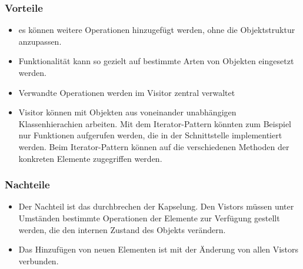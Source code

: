 \subsubsection{Vorteile}
\begin{itemize}
\item es können weitere Operationen hinzugefügt werden, ohne die Objektstruktur anzupassen.
\item Funktionalität kann so gezielt auf bestimmte Arten von Objekten eingesetzt werden.
\item Verwandte Operationen werden im Visitor zentral verwaltet
\item Visitor können mit Objekten aus voneinander unabhängigen Klassenhierachien arbeiten. Mit dem Iterator-Pattern könnten zum Beispiel nur Funktionen aufgerufen werden, die in der Schnittstelle implementiert werden. Beim Iterator-Pattern können auf die verschiedenen Methoden der konkreten Elemente zugegriffen werden.
\end{itemize}
\subsubsection{Nachteile}
\begin{itemize}

\item Der Nachteil ist das durchbrechen der Kapselung. Den Vistors müssen unter Umständen bestimmte Operationen der Elemente zur Verfügung gestellt werden, die den internen Zustand des Objekts verändern.
\item Das Hinzufügen von neuen Elementen ist mit der Änderung von allen Vistors verbunden.
\end{itemize}